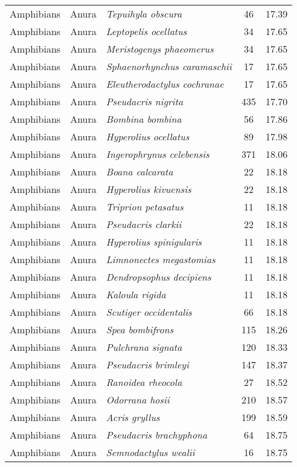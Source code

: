 \begin{longtable}{ll>{\itshape}lcc}
  Amphibians & Anura & Tepuihyla obscura &  46 & 17.39 \\ 
  Amphibians & Anura & Leptopelis ocellatus &  34 & 17.65 \\ 
  Amphibians & Anura & Meristogenys phaeomerus &  34 & 17.65 \\ 
  Amphibians & Anura & Sphaenorhynchus caramaschii &  17 & 17.65 \\ 
  Amphibians & Anura & Eleutherodactylus cochranae &  17 & 17.65 \\ 
  Amphibians & Anura & Pseudacris nigrita & 435 & 17.70 \\ 
  Amphibians & Anura & Bombina bombina &  56 & 17.86 \\ 
  Amphibians & Anura & Hyperolius ocellatus &  89 & 17.98 \\ 
  Amphibians & Anura & Ingerophrynus celebensis & 371 & 18.06 \\ 
  Amphibians & Anura & Boana calcarata &  22 & 18.18 \\ 
  Amphibians & Anura & Hyperolius kivuensis &  22 & 18.18 \\ 
  Amphibians & Anura & Triprion petasatus &  11 & 18.18 \\ 
  Amphibians & Anura & Pseudacris clarkii &  22 & 18.18 \\ 
  Amphibians & Anura & Hyperolius spinigularis &  11 & 18.18 \\ 
  Amphibians & Anura & Limnonectes megastomias &  11 & 18.18 \\ 
  Amphibians & Anura & Dendropsophus decipiens &  11 & 18.18 \\ 
  Amphibians & Anura & Kaloula rigida &  11 & 18.18 \\ 
  Amphibians & Anura & Scutiger occidentalis &  66 & 18.18 \\ 
  Amphibians & Anura & Spea bombifrons & 115 & 18.26 \\ 
  Amphibians & Anura & Pulchrana signata & 120 & 18.33 \\ 
  Amphibians & Anura & Pseudacris brimleyi & 147 & 18.37 \\ 
  Amphibians & Anura & Ranoidea rheocola &  27 & 18.52 \\ 
  Amphibians & Anura & Odorrana hosii & 210 & 18.57 \\ 
  Amphibians & Anura & Acris gryllus & 199 & 18.59 \\ 
  Amphibians & Anura & Pseudacris brachyphona &  64 & 18.75 \\ 
  Amphibians & Anura & Semnodactylus wealii &  16 & 18.75 \\ 

\end{longtable}
